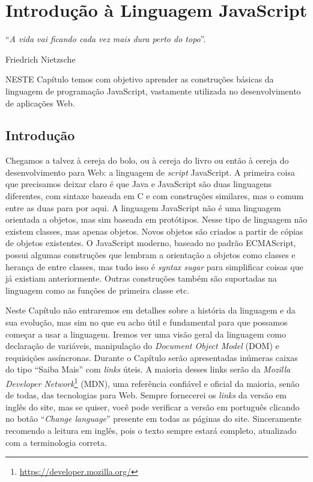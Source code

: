 \chapter{Introdução à Linguagem JavaScript}\label{cap:javaScript}
\epigraph{``\textit{A vida vai ficando cada vez mais dura perto do topo}''.}{Friedrich Nietzsche}

\lettrine[lines=4, lhang=0.1, lraise=0, loversize=0.2, findent=0.1em]{\textcolor{corAzulTema}{N}}{ESTE} Capítulo temos com objetivo aprender as construções básicas da linguagem de programação JavaScript, vastamente utilizada no desenvolvimento de aplicações Web.

\section{Introdução}

Chegamos a talvez à cereja do bolo, ou à cereja do livro ou então à cereja do desenvolvimento para Web: a linguagem de \textit{script} JavaScript. A primeira coisa que precisamos deixar claro é que Java e JavaScript são duas linguagens diferentes, com sintaxe baseada em C e com construções similares, mas o comum entre as duas para por aqui. A linguagem JavaScript não é uma linguagem orientada a objetos, mas sim baseada em protótipos. Nesse tipo de linguagem não existem classes, mas apenas objetos. Novos objetos são criados a partir de cópias de objetos existentes. O JavaScript moderno, baseado no padrão ECMAScript, possui algumas construções que lembram a orientação a objetos como classes e herança de entre classes, mas tudo isso é \textit{syntax sugar} para simplificar coisas que já existiam anteriormente. Outras construções também são suportadas na linguagem como as funções de primeira classe etc.

Neste Capítulo não entraremos em detalhes sobre a história da linguagem e da sua evolução, mas sim no que eu acho útil e fundamental para que possamos começar a usar a linguagem. Iremos ver uma visão geral da linguagem como declaração de variáveis, manipulação do \textit{Document Object Model} (DOM) e requisições assíncronas. Durante o Capítulo serão apresentadas inúmeras caixas do tipo ``Saiba Mais'' com \textit{links} úteis. A maioria desses links serão da \textit{Mozilla Developer Network}\footnote{\url{https://developer.mozilla.org/}} (MDN), uma referência confiável e oficial da maioria, senão de todas, das tecnologias para Web. Sempre fornecerei os \textit{links} da versão em inglês do site, mas se quiser, você pode verificar a versão em português clicando no botão ``\textit{Change language}'' presente em todas as páginas do site. Sinceramente recomendo a leitura em inglês, pois o texto sempre estará completo, atualizado com a terminologia correta.

